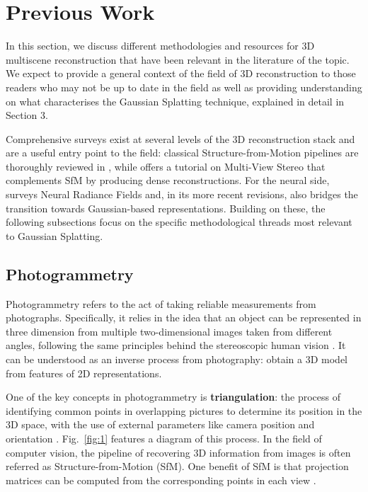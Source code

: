 \documentclass[
	a4paper, %
	10pt, %
	unnumberedsections, %
	twoside, %
]{LTJournalArticle}
\begin{document}
\section{Previous Work}
In this section, we discuss different methodologies and resources for 3D multiscene reconstruction that have been relevant in the literature of the topic. We expect to provide a general context of the field of 3D reconstruction to those readers who may not be up to date in the field as well as providing understanding on what characterises the Gaussian Splatting technique, explained in detail in Section 3.

Comprehensive surveys exist at several levels of the 3D reconstruction stack and are a useful entry point to the field: classical Structure-from-Motion pipelines are thoroughly reviewed in \cite{survey_sfm_ozyesil2017}, while \cite{survey_mvs_furukawa2015} offers a tutorial on Multi-View Stereo that complements SfM by producing dense reconstructions. For the neural side, \cite{survey_nerf_gao2022} surveys Neural Radiance Fields and, in its more recent revisions, also bridges the transition towards Gaussian-based representations. Building on these, the following subsections focus on the specific methodological threads most relevant to Gaussian Splatting.

\subsection{Photogrammetry}
Photogrammetry refers to the act of taking reliable measurements from photographs. Specifically, it relies in the idea that an object can be represented in three dimension from multiple two-dimensional images taken from different angles, following the same principles behind the stereoscopic human vision \cite{photogrammetry_2freedom}. It can be understood as an inverse process from photography: obtain a 3D model from features of 2D representations.

One of the key concepts in photogrammetry is \textbf{triangulation}: the process of identifying common points in overlapping pictures to determine its position in the 3D space, with the use of external parameters like camera position and orientation \cite{photogrammetry_artec}. Fig.~\ref{fig:1} features a diagram of this process.
In the field of computer vision, the pipeline of recovering 3D information from images is often referred as Structure-from-Motion (SfM). One benefit of SfM is that projection matrices can be computed from the corresponding points in each view \cite{sfm_medium}.
\end{document}
